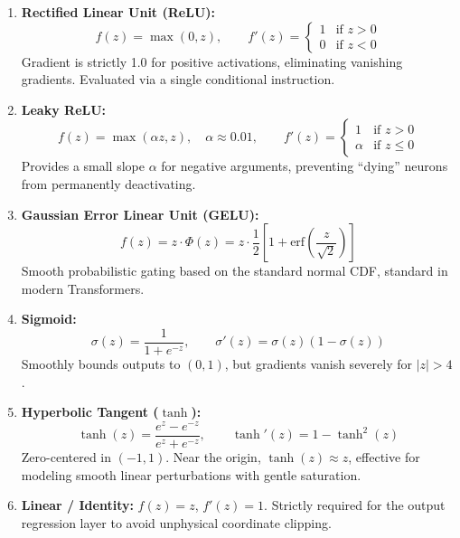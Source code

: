 \documentclass[11pt,a4paper]{article}
\begin{document}
\begin{enumerate}
    \item \textbf{Rectified Linear Unit (ReLU):}
    \begin{equation}
        f(z) = \max(0, z), \qquad f'(z) = \begin{cases} 1 & \text{if } z > 0 \\ 0 & \text{if } z < 0 \end{cases}
    \end{equation}
    Gradient is strictly 1.0 for positive activations, eliminating vanishing gradients. Evaluated via a single conditional instruction.
    \item \textbf{Leaky ReLU:}
    \begin{equation}
        f(z) = \max(\alpha z, z), \quad \alpha \approx 0.01, \qquad f'(z) = \begin{cases} 1 & \text{if } z > 0 \\ \alpha & \text{if } z \le 0 \end{cases}
    \end{equation}
    Provides a small slope $\alpha$ for negative arguments, preventing ``dying'' neurons from permanently deactivating.
    \item \textbf{Gaussian Error Linear Unit (GELU):}
    \begin{equation}
        f(z) = z \cdot \Phi(z) = z \cdot \frac{1}{2}\left[1 + \text{erf}\left(\frac{z}{\sqrt{2}}\right)\right]
    \end{equation}
    Smooth probabilistic gating based on the standard normal CDF, standard in modern Transformers.
    \item \textbf{Sigmoid:}
    \begin{equation}
        \sigma(z) = \frac{1}{1 + e^{-z}}, \qquad \sigma'(z) = \sigma(z)(1 - \sigma(z))
    \end{equation}
    Smoothly bounds outputs to $(0, 1)$, but gradients vanish severely for $|z| > 4$.
    \item \textbf{Hyperbolic Tangent ($\tanh$):}
    \begin{equation}
        \tanh(z) = \frac{e^z - e^{-z}}{e^z + e^{-z}}, \qquad \tanh'(z) = 1 - \tanh^2(z)
    \end{equation}
    Zero-centered in $(-1, 1)$. Near the origin, $\tanh(z) \approx z$, effective for modeling smooth linear perturbations with gentle saturation.
    \item \textbf{Linear / Identity:} $f(z) = z$, $f'(z) = 1$. Strictly required for the output regression layer to avoid unphysical coordinate clipping.
\end{enumerate}
\end{document}
